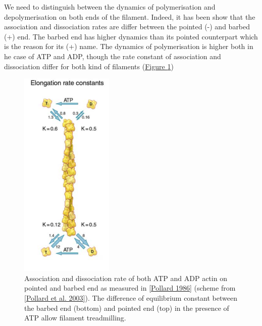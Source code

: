 \documentclass[A4paperpaper,11pt,english]{sphinxmanual}
\begin{document}
We need to distinguish between the dynamics of polymerisation and
depolymerisation on both ends of the filament. Indeed, it has been show that the
association and dissociation rates are differ between the pointed (-) and
barbed (+) end. The barbed end has  higher dynamics than its pointed
counterpart which is the reason for its (+) name. The dynamics of
polymerisation is higher both in he case of ATP and ADP, though the rate
constant of association and dissociation differ for both kind of filaments (\hyperref[index-latex:fig-actin-pollard]{Figure  \ref*{index-latex:fig-actin-pollard}})
\begin{figure}[htbp]
\centering
\capstart

\includegraphics[width=0.250\linewidth]{elongation-rate-constant.png}
\caption{Association and dissociation rate of both ATP and ADP actin on pointed and
barbed end as measured in {\hyperref[index-latex:pollard1986]{{[}Pollard  1986{]}}} (scheme from {\hyperref[index-latex:pollard2003]{{[}Pollard et al. 2003{]}}}).
The difference of equilibrium constant between the barbed end (bottom)
and pointed end (top) in the presence of ATP allow filament treadmilling.}\label{index-latex:fig-actin-pollard}\end{figure}
\end{document}
